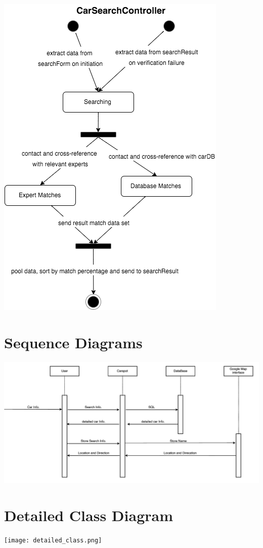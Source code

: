 \documentclass[12pt]{article}
\begin{document}
\includegraphics[scale=0.5]{carSearchController-sd.png}\\

\section{Sequence Diagrams}
\includegraphics[width=\textwidth]{sequence.png}

\section{Detailed Class Diagram}
\texttt{[image: detailed\_class.png]}
\end{document}
